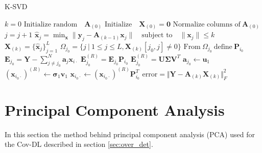 \begin{algorithm}[H]
\caption{K-SVD}
\begin{algorithmic}[1]
			\State$k = 0$			
			\State$\text{Initialize random} \quad  \textbf{A}_{(0)}$            
			\State$\text{Initialize} \quad \textbf{X}_{(0)}=\mathbf{0}$
			\State
            \State$\text{Normalize columns of} \ \textbf{A}_{(0)}$
                \State $j = j+1$
                 
                	\State$\hat{\textbf{x}}_{j} = \min_{\textbf{x}} \|\textbf{y}_j -\textbf{A}_{(k-1)}\textbf{x}_{j}\| \quad \text{subject to} \quad \|\textbf{x}_{j}\| \leq k $ 
				\EndFor
				\State$\textbf{X}_{(k)} = \lbrace \hat{\textbf{x}}_{j} \rbrace_{j=1}^{L}$
					\State$\Omega_{j_0} = \lbrace j \ \vert \ 1 \leq j \leq L, \textbf{X}_{(k)} [j_0, j]\neq 0\rbrace$
					\State$\text{From} \ \Omega_{j_0} \ \text{define} \ \textbf{P}_{i_0} $
					\State$\textbf{E}_{j_0} =  \textbf{Y} - \sum_{j \neq j_{0}}^{N} \textbf{a}_j \textbf{x}_{i \cdot}$
					\State$\textbf{E}_{j_0}^{(R)} =  \textbf{E}_{j_0} \textbf{P}_{i_0}$
					\State$\textbf{E}_{j_0}^{(R)} =\textbf{U} \boldsymbol{\Sigma} \textbf{V}^T$ 
					\State$\textbf{a}_{j_0} \gets \textbf{u}_{1}$ 
					\State$\left( \textbf{x}_{i_0 \cdot} \right)^{(R)} \gets \boldsymbol{\sigma}_{1} \textbf{v}_{1}$
					\State$\textbf{x}_{i_0 \cdot} \gets \left( \textbf{x}_{i_0 \cdot} \right)^{(R)} \textbf{P}_{i_0}^T $ 
				\EndFor
				\State$\text{error} = \Vert \textbf{Y} - \textbf{A}_{(k)} \textbf{X}_{(k)} \Vert_{F}^2 $
          		\EndWhile
            \EndProcedure
        \end{algorithmic} 
        \label{alg:K_SVD}
\end{algorithm}

\section{Principal Component Analysis}\label{app_sec:PCA}
In this section the method behind principal component analysis (PCA) used for the Cov-DL described in section \ref{sec:over_det}.

